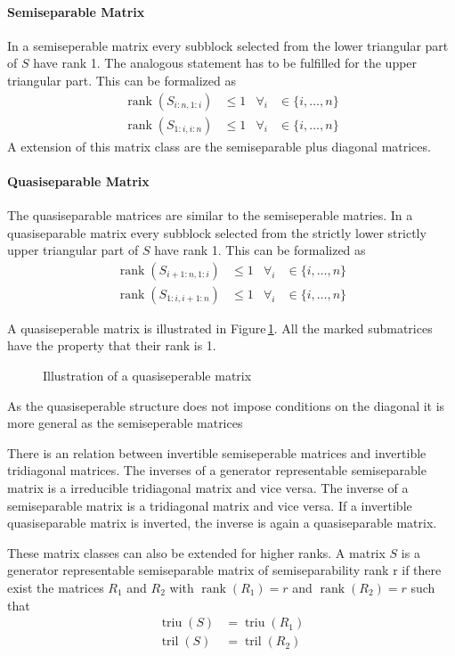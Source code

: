 \documentclass[doctype=mastersthesis,BCOR=15mm,biblatex]{ldvbook}%
\DeclareMathOperator{\rank}{rank}
\DeclareMathOperator{\triu}{triu}
\DeclareMathOperator{\tril}{tril}
\begin{document}
\paragraph{Semiseparable Matrix}
In a semiseperable matrix every subblock selected from the lower triangular part of $S$ have rank 1. The analogous statement has to be fulfilled for the upper triangular part.
This can be formalized as 
\begin{align}
	\rank(S_{i:n,1:i}) &\leq 1 & \forall_i &\in\{i,\dots,n\}\\
	\rank(S_{1:i,i:n}) &\leq 1 & \forall_i &\in\{i,\dots,n\}
\end{align}
A extension of this matrix class are the semiseparable plus diagonal matrices.

\paragraph{Quasiseparable Matrix}
The quasiseparable matrices are similar to the semiseperable matries. In a quasiseparable matrix every subblock selected from the strictly lower strictly upper triangular part of $S$ have rank 1. 
This can be formalized as 
\begin{align}
\rank(S_{i+1:n,1:i}) &\leq 1 & \forall_i &\in\{i,\dots,n\}\\
\rank(S_{1:i,i+1:n}) &\leq 1 & \forall_i &\in\{i,\dots,n\}
\end{align}

A quasiseperable matrix is illustrated in Figure\,\ref{fig:quasiseperable}. All the marked submatrices have the property that their rank is 1.
\begin{figure}
	\centering
	
	\caption{Illustration of a quasiseperable matrix}
	\label{fig:quasiseperable}
\end{figure}
As the quasiseperable structure does not impose conditions on the diagonal it is more general as the semiseperable matrices 

There is an relation between invertible semiseperable matrices and invertible tridiagonal matrices.
The inverses of a generator representable semiseparable matrix is a irreducible tridiagonal matrix and vice versa. 
The inverse of a semiseparable matrix is a tridiagonal matrix and vice versa.
If a invertible quasiseparable matrix is inverted, the inverse is again a quasiseparable matrix.

These matrix classes can also be extended for higher ranks.
A matrix $S$ is a generator representable semiseparable matrix of semiseparability rank r if there exist the matrices $R_1$ and $R_2$ with $\rank(R_1)=r$ and $\rank(R_2)=r$ such that
\begin{align}
\triu(S) &= \triu(R_1)\\
\tril(S) &= \tril(R_2)
\end{align}
\end{document}
